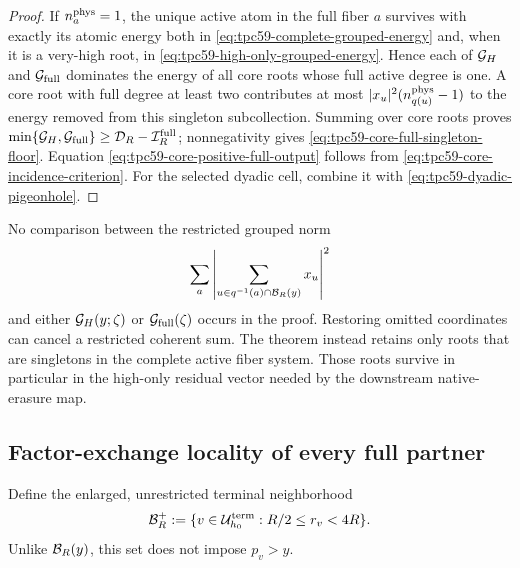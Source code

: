 \begin{proof}
If \(n_a^{\rm phys}=1\), the unique active atom in the full fiber \(a\)
survives with exactly its atomic energy both in
\eqref{eq:tpc59-complete-grouped-energy} and, when it is a very-high root,
in \eqref{eq:tpc59-high-only-grouped-energy}.  Hence each of
\(\mathcal G_H\) and \(\mathcal G_{\rm full}\) dominates the energy of all core roots
whose full active degree is one.  A core root with full degree
at least two contributes at most
\(
 |x_u|^2(n_{q(u)}^{\rm phys}-1)
\)
to the energy removed from this singleton subcollection.  Summing over
core roots proves
\(
 \min\{\mathcal G_H,\mathcal G_{\rm full}\}\ge
 \mathcal D_R-\mathcal I_R^{\rm full}
\);
nonnegativity gives \eqref{eq:tpc59-core-full-singleton-floor}.
Equation \eqref{eq:tpc59-core-positive-full-output} follows from
\eqref{eq:tpc59-core-incidence-criterion}.  For the selected dyadic cell,
combine it with \eqref{eq:tpc59-dyadic-pigeonhole}.
\end{proof}

No comparison between the restricted grouped norm
\[
 \sum_a\left|
   \sum_{u\in q^{-1}(a)\cap\mathcal B_R(y)}x_u
 \right|^2
\]
and either \(\mathcal G_H(y;\zeta)\) or \(\mathcal G_{\rm full}(\zeta)\) occurs in the
proof.  Restoring omitted coordinates can cancel a restricted coherent sum.
The theorem instead retains only roots that are singletons in the complete
active fiber system.  Those roots survive in particular in the high-only
residual vector needed by the downstream native-erasure map.

\subsection{Factor-exchange locality of every full partner}

Define the enlarged, unrestricted terminal neighborhood
\begin{equation}
 \mathcal B_R^+
 :=\{v\in\mathcal U_{h_0}^{\rm term}:R/2\le r_v<4R\}.
 \label{eq:tpc59-enlarged-full-terminal-block}
\end{equation}
Unlike \(\mathcal B_R(y)\), this set does not impose \(p_v>y\).

